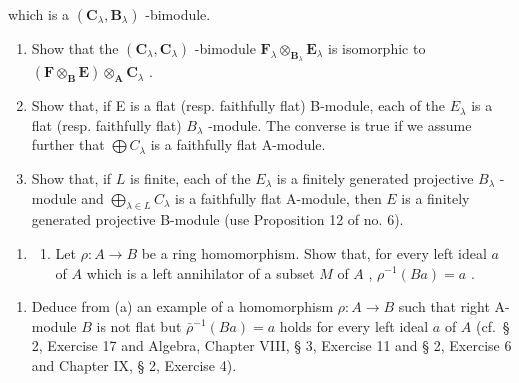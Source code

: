 which is a \((\mathbf{C}_{\lambda},\mathbf{B}_{\lambda})\) -bimodule.

\begin{enumerate}
\def\labelenumi{(\alph{enumi})}
\item
  Show that the \((\mathbf{C}_{\lambda},\mathbf{C}_{\lambda})\) -bimodule \(\mathbf{F}_{\lambda}\otimes_{\mathbf{B}_{\lambda}}\mathbf{E}_{\lambda}\) is isomorphic to \((\mathbf{F}\otimes_{\mathbf{B}}\mathbf{E})\otimes_{\mathbf{A}}\mathbf{C}_{\lambda}\) .
\item
  Show that, if E is a flat (resp. faithfully flat) B-module, each of the \(E_{\lambda}\) is a flat (resp. faithfully flat) \(B_{\lambda}\) -module. The converse is true if we assume further that \(\bigoplus C_{\lambda}\) is a faithfully flat A-module.
\item
  Show that, if \(L\) is finite, each of the \(E_{\lambda}\) is a finitely generated projective \(B_{\lambda}\) -module and \(\bigoplus_{\lambda \in L} C_{\lambda}\) is a faithfully flat A-module, then \(E\) is a finitely generated projective B-module (use Proposition 12 of no. 6).
\end{enumerate}

\begin{enumerate}
\def\labelenumi{\arabic{enumi}.}
\setcounter{enumi}{9}
\tightlist
\item
  \begin{enumerate}
  \def\labelenumii{(\alph{enumii})}
  \tightlist
  \item
    Let \(\rho: A \to B\) be a ring homomorphism. Show that, for every left ideal \(a\) of \(A\) which is a left annihilator of a subset \(M\) of \(A\) , \(\rho^{-1}(Ba) = a\) .
  \end{enumerate}
\end{enumerate}

\begin{enumerate}
\def\labelenumi{(\alph{enumi})}
\setcounter{enumi}{1}
\tightlist
\item
  Deduce from (a) an example of a homomorphism \(\rho: A \to B\) such that right A-module \(B\) is not flat but \(\bar{\rho}^{-1}(Ba) = a\) holds for every left ideal \(a\) of \(A\) (cf.~§ 2, Exercise 17 and Algebra, Chapter VIII, § 3, Exercise 11 and § 2, Exercise 6 and Chapter IX, § 2, Exercise 4).
\end{enumerate}

